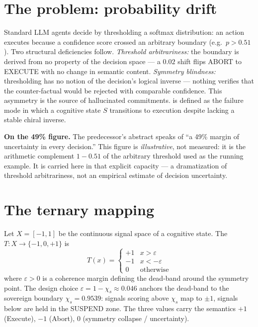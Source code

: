 \documentclass{alienfolio}
\begin{document}
\section{The problem: probability drift}
Standard LLM agents decide by thresholding a softmax distribution: an action
executes because a confidence score crossed an arbitrary boundary (e.g.\
$p > 0.51$). Two structural deficiencies follow. \emph{Threshold
arbitrariness:} the boundary is derived from no property of the decision
space --- a $0.02$ shift flips ABORT to EXECUTE with no change in semantic
content. \emph{Symmetry blindness:} thresholding has no notion of the
decision's logical inverse --- nothing verifies that the counter-factual
would be rejected with comparable confidence. This asymmetry is the source of
hallucinated commitments. \key{Probability drift} is defined as the failure
mode in which a cognitive state $S$ transitions to execution despite lacking
a stable chiral inverse.

\textbf{On the 49\% figure.} The predecessor's abstract speaks of ``a 49\%
margin of uncertainty in every decision.'' This figure is
\emph{illustrative}, not measured: it is the arithmetic complement
$1 - 0.51$ of the arbitrary threshold used as the running example. It is
carried here in that explicit capacity --- a dramatization of threshold
arbitrariness, not an empirical estimate of decision uncertainty.

\section{The ternary mapping}
Let $X = [-1,1]$ be the continuous signal space of a cognitive state. The
\key{ternary mapping} $T: X \to \{-1, 0, +1\}$ is
\begin{equation}
T(x) = \begin{cases}
+1 & x > \varepsilon \\
-1 & x < -\varepsilon \\
0 & \text{otherwise}
\end{cases}
\end{equation}
where $\varepsilon > 0$ is a coherence margin defining the dead-band around
the symmetry point. The design choice $\varepsilon = 1 - \chi_s \approx
0.046$ anchors the dead-band to the sovereign boundary $\chi_s = 0.9539$:
signals scoring above $\chi_s$ map to $\pm 1$, signals below are held in the
SUSPEND zone. The three values carry the semantics $+1$ (Execute), $-1$
(Abort), $0$ (symmetry collapse / uncertainty).
\end{document}
